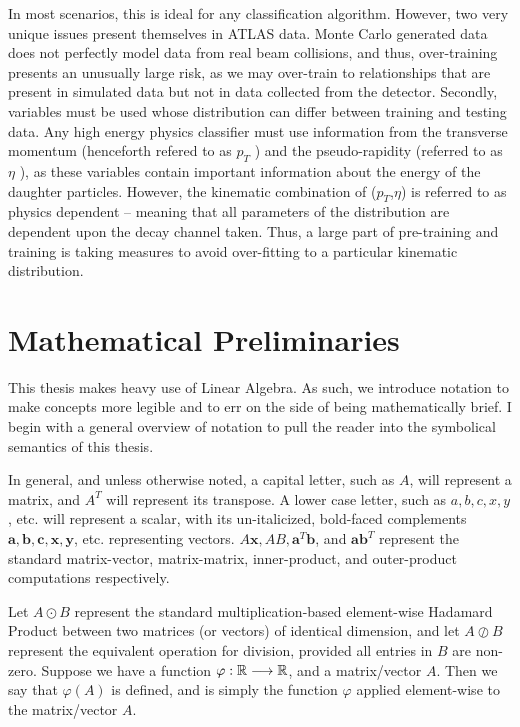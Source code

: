 In most scenarios, this is ideal for any classification algorithm. However, two very unique issues present themselves in ATLAS data. Monte Carlo generated data does not perfectly model data from real beam collisions, and thus, over-training presents an unusually large risk, as we may over-train to relationships that are present in simulated data but not in data collected from the detector. Secondly, variables must be used whose distribution can differ between training and testing data. Any high energy physics classifier must use information from the transverse momentum (henceforth refered to as $p_{T}$
 ) and the pseudo-rapidity (referred to as $\eta$
 ), as these variables contain important information about the energy of the daughter particles. However, the kinematic combination of ($p_{T}$,$\eta$)
  is referred to as physics dependent -- meaning that all parameters of the distribution are dependent upon the decay channel taken. Thus, a large part of pre-training and training is taking measures to avoid over-fitting to a particular kinematic distribution.
  
\section{Mathematical Preliminaries}
This thesis makes heavy use of Linear Algebra. As such, we introduce notation to make concepts more legible and to err on the side of being mathematically brief. I begin with a general overview of notation to pull the reader into the symbolical semantics of this thesis. 

In general, and unless otherwise noted, a capital letter, such as $A$, will represent a matrix, and $A^T$ will represent its transpose. A lower case letter, such as $a,b,c,x,y$, etc. will represent a scalar, with its un-italicized, bold-faced complements $\mathbf{a},\mathbf{b},\mathbf{c},\mathbf{x},\mathbf{y}$, etc. representing vectors. $A\mathbf{x}, AB, \mathbf{a}^T \mathbf{b}$, and $\mathbf{a} \mathbf{b}^T$ represent the standard matrix-vector, matrix-matrix, inner-product, and outer-product computations respectively.

Let $A\odot B$ represent the standard multiplication-based element-wise Hadamard Product between two matrices (or vectors) of identical dimension, and let $A\oslash B$ represent the equivalent operation for division, provided all entries in $B$ are non-zero. Suppose we have a function $\varphi : \mathbb{R} \longrightarrow \mathbb{R}$, and a matrix/vector $A$. Then we say that $\varphi(A)$ is defined, and is simply the function $\varphi$ applied element-wise to the matrix/vector $A$.

